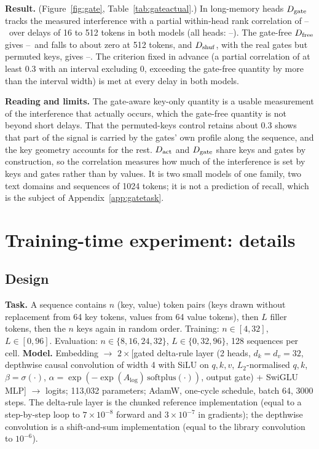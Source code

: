 \textbf{Result.} (Figure~\ref{fig:gate}, Table~\ref{tab:gateactual}.) In long-memory heads $D_{\rm gate}$ tracks the measured interference with a partial within-head rank correlation of \gatePartLo--\gatePartHi\ over delays of 16 to 512 tokens in both models (all heads: \gateAllPartLo--\gateAllPartHi). The gate-free $D_{\rm free}$ gives \freePartLo--\freePartHi\ and falls to about zero at 512 tokens, and $D_{\rm shuf}$, with the real gates but permuted keys, gives \shufPartLo--\shufPartHi. The criterion fixed in advance (a partial correlation of at least 0.3 with an interval excluding 0, exceeding the gate-free quantity by more than the interval width) is met at every delay in both models.

\textbf{Reading and limits.} The gate-aware key-only quantity is a usable measurement of the interference that actually occurs, which the gate-free quantity is not beyond short delays. That the permuted-keys control retains about 0.3 shows that part of the signal is carried by the gates' own profile along the sequence, and the key geometry accounts for the rest. $D_{\rm act}$ and $D_{\rm gate}$ share keys and gates by construction, so the correlation measures how much of the interference is set by keys and gates rather than by values. It is two small models of one family, two text domains and sequences of 1024 tokens; it is not a prediction of recall, which is the subject of Appendix~\ref{app:gatetask}.

\section{Training-time experiment: details}\label{app:lever}
\subsection{Design}
\textbf{Task.} A sequence contains $n$ (key, value) token pairs (keys drawn without replacement from 64 key tokens, values from 64 value tokens), then $L$ filler tokens, then the $n$ keys again in random order. Training: $n\in[4,32]$, $L\in[0,96]$. Evaluation: $n\in\{8,16,24,32\}$, $L\in\{0,32,96\}$, 128 sequences per cell. \textbf{Model.} Embedding $\to$ $2\times$[gated delta-rule layer (2 heads, $d_k=d_v=32$, depthwise causal convolution of width 4 with SiLU on $q,k,v$, $L_2$-normalised $q,k$, $\beta=\sigma(\cdot)$, $\alpha=\exp(-\exp(A_{\log})\,\mathrm{softplus}(\cdot))$, output gate) + SwiGLU MLP] $\to$ logits; 113{,}032 parameters; AdamW, one-cycle schedule, batch 64, 3000 steps. The delta-rule layer is the chunked reference implementation (equal to a step-by-step loop to $7\times10^{-8}$ forward and $3\times10^{-7}$ in gradients); the depthwise convolution is a shift-and-sum implementation (equal to the library convolution to $10^{-6}$).

